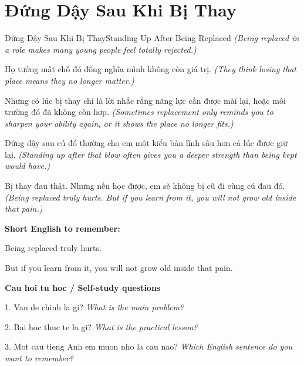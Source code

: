 \section{Đứng Dậy Sau Khi Bị Thay}
\begin{truyen}{Đứng Dậy Sau Khi Bị Thay}{Standing Up After Being Replaced}
\textit{(Being replaced in a role makes many young people feel totally rejected.)}

Họ tưởng mất chỗ đó đồng nghĩa mình không còn giá trị.
\textit{(They think losing that place means they no longer matter.)}

Nhưng có lúc bị thay chỉ là lời nhắc rằng năng lực cần được mài lại, hoặc môi trường đó đã không còn hợp.
\textit{(Sometimes replacement only reminds you to sharpen your ability again, or it shows the place no longer fits.)}

Đứng dậy sau cú đó thường cho em một kiểu bản lĩnh sâu hơn cả lúc được giữ lại.
\textit{(Standing up after that blow often gives you a deeper strength than being kept would have.)}

\end{truyen}

\begin{baihoc}
Bị thay đau thật. Nhưng nếu học được, em sẽ không bị cũ đi cùng cú đau đó.
\textit{(Being replaced truly hurts. But if you learn from it, you will not grow old inside that pain.)}
\end{baihoc}

\begin{ghinhoanh}
\textbf{Short English to remember:}

Being replaced truly hurts.

But if you learn from it, you will not grow old inside that pain.

\end{ghinhoanh}

\begin{tuhocnhanh}
\textbf{Cau hoi tu hoc / Self-study questions}

1. Van de chinh la gi? \textit{What is the main problem?}

2. Bai hoc thuc te la gi? \textit{What is the practical lesson?}

3. Mot cau tieng Anh em muon nho la cau nao? \textit{Which English sentence do you want to remember?}
\end{tuhocnhanh}
